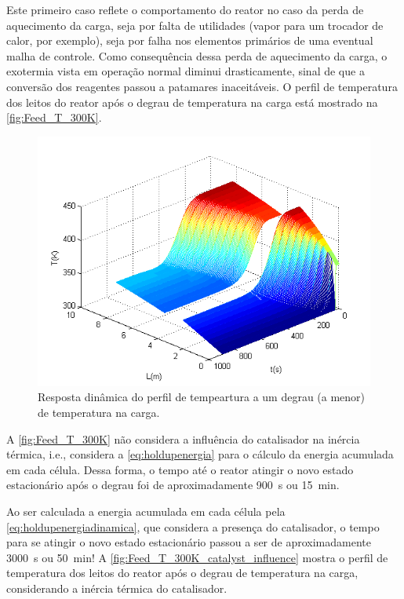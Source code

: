 Este primeiro caso reflete o comportamento do reator no caso da perda de
aquecimento da carga, seja por falta de utilidades (vapor para um trocador de
calor, por exemplo), seja por falha nos elementos primários de uma eventual
malha de controle. Como consequência dessa perda de aquecimento da carga, o
exotermia vista em operação normal diminui drasticamente, sinal de que a
conversão dos reagentes passou a patamares inaceitáveis. O perfil de temperatura
dos leitos do reator após o degrau de temperatura na carga está mostrado na
\autoref{fig:Feed_T_300K}.

\begin{figure}[htb]
\centering
\includegraphics[scale=0.8]{images/Chap4/Feed_T_300K.png}
\caption{Resposta dinâmica do perfil de tempeartura a um degrau (a menor) de
temperatura na carga.}
\label{fig:Feed_T_300K}
\end{figure}

A \autoref{fig:Feed_T_300K} não considera a influência do catalisador na inércia
térmica, i.e., considera a \autoref{eq:holdupenergia} para o cálculo da energia
acumulada em cada célula. Dessa forma, o tempo até o reator atingir o novo
estado estacionário após o degrau foi de aproximadamente \SI{900}{s} ou
\SI{15}{min}.

Ao ser calculada a energia acumulada em cada célula pela
\autoref{eq:holdupenergiadinamica}, que considera a presença do catalisador, o
tempo para se atingir o novo estado estacionário passou a ser de aproximadamente
\SI{3000}{s} ou \SI{50}{min}! A \autoref{fig:Feed_T_300K_catalyst_influence}
mostra o perfil de temperatura dos leitos do reator após o degrau de temperatura na carga,
considerando a inércia térmica do catalisador.


